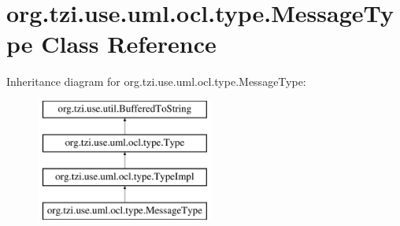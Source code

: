\hypertarget{classorg_1_1tzi_1_1use_1_1uml_1_1ocl_1_1type_1_1_message_type}{\section{org.\-tzi.\-use.\-uml.\-ocl.\-type.\-Message\-Type Class Reference}
\label{classorg_1_1tzi_1_1use_1_1uml_1_1ocl_1_1type_1_1_message_type}
}
Inheritance diagram for org.\-tzi.\-use.\-uml.\-ocl.\-type.\-Message\-Type\-:\begin{figure}[H]
\begin{center}
\leavevmode
\includegraphics[height=4.000000cm]{classorg_1_1tzi_1_1use_1_1uml_1_1ocl_1_1type_1_1_message_type}
\end{center}
\end{figure}
